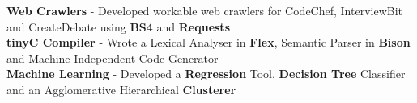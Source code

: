 \documentclass[10pt]{article}
\begin{document}
\vspace{-2ex}
{\color{headliner} \spacedhrule{0.15ex}{1.0ex}}
\begin{indentsection}
    \smaller\href{https://github.com/shmundhra?tab=repositories}     {\faGithub}\hspace{0.5ex}\normalsize \textbf{Web Crawlers} {\hfill}{- Developed workable web crawlers for CodeChef, InterviewBit and CreateDebate using \textbf{BS4} and \textbf{Requests}}
    \\[0.05em] \smaller\href{https://github.com/shmundhra/tinyC-Compiler}     {\faGithub}\hspace{0.5ex}\normalsize \textbf{tinyC Compiler} {\hfill}{- Wrote a Lexical Analyser in \textbf{Flex}, Semantic Parser in \textbf{Bison} and Machine Independent Code Generator}
    \\[0.05em] \smaller\href{https://github.com/shmundhra/Machine-Learning} {\faGithub}\hspace{0.5ex}\normalsize \textbf{Machine Learning} {\hfill}{- Developed a \textbf{Regression} Tool, \textbf{Decision Tree} Classifier and an Agglomerative Hierarchical \textbf{Clusterer}}
\end{indentsection}
\end{document}
